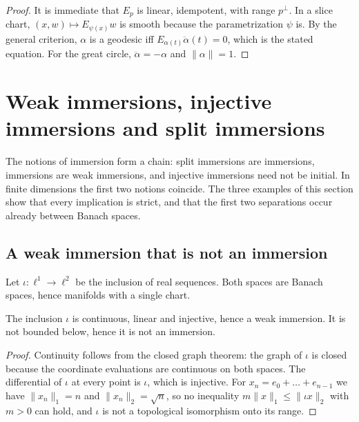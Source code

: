 \begin{proof}
  \leanok
  It is immediate that $E_p$ is linear, idempotent, with range $p^\perp$. In a slice chart,
  $(x, w) \mapsto E_{\psi(x)} w$ is smooth because the parametrization $\psi$ is. By the general
  criterion, $\alpha$ is a geodesic iff $E_{\alpha(t)}\ddot\alpha(t) = 0$, which is the stated
  equation. For the great circle, $\ddot\alpha = -\alpha$ and $\|\alpha\| = 1$.
\end{proof}

\section{Weak immersions, injective immersions and split immersions}

The notions of immersion form a chain: split immersions are immersions,
immersions are weak immersions, and injective immersions need not be initial. In finite
dimensions the first two notions coincide. The three examples of this section show that every
implication is strict, and that the first two separations occur already between Banach spaces.

\subsection{A weak immersion that is not an immersion}

Let $\iota \colon \ell^1 \to \ell^2$ be the inclusion of real sequences. Both spaces are Banach
spaces, hence manifolds with a single chart.

\begin{proposition}
  \label{prop:ex-l1-l2}
  \leanok
  The inclusion $\iota$ is continuous, linear and injective, hence a weak immersion. It is not
  bounded below, hence it is not an immersion.
\end{proposition}

\begin{proof}
  \leanok
  Continuity follows from the closed graph theorem: the graph of $\iota$ is closed because the
  coordinate evaluations are continuous on both spaces. The differential of $\iota$ at every
  point is $\iota$, which is injective. For $x_n = e_0 + \dots + e_{n-1}$ we have
  $\|x_n\|_1 = n$ and $\|x_n\|_2 = \sqrt n$, so no inequality $m\|x\|_1 \le \|\iota x\|_2$ with
  $m > 0$ can hold, and $\iota$ is not a topological isomorphism onto its range.
\end{proof}

